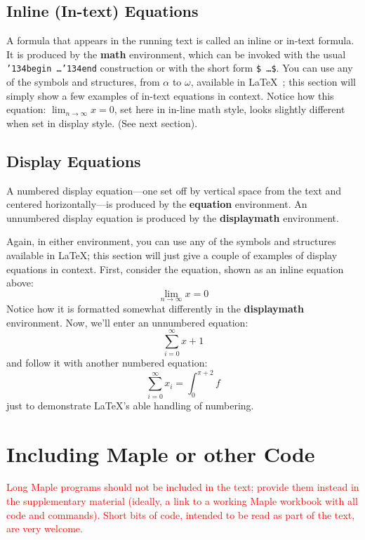 \documentclass[anonymous,review,acmsmall,screen]{MapleTrans}
\begin{document}
\subsection{Inline (In-text) Equations}
A formula that appears in the running text is called an inline or
in-text formula.  It is produced by the \textbf{math} environment,
which can be invoked with the usual
\texttt{{\char'134}begin\,\ldots{\char'134}end} construction or with
the short form \texttt{\$\,\ldots\$}. You can use any of the symbols
and structures, from $\alpha$ to $\omega$, available in
\LaTeX~\cite{Lamport:LaTeX}; this section will simply show a few
examples of in-text equations in context. Notice how this equation:
\begin{math}
  \lim_{n\rightarrow \infty}x=0
\end{math},
set here in in-line math style, looks slightly different when
set in display style.  (See next section).

\subsection{Display Equations}
A numbered display equation---one set off by vertical space from the
text and centered horizontally---is produced by the \textbf{equation}
environment. An unnumbered display equation is produced by the
\textbf{displaymath} environment.

Again, in either environment, you can use any of the symbols and
structures available in \LaTeX\@; this section will just give a couple
of examples of display equations in context.  First, consider the
equation, shown as an inline equation above:
\begin{equation}
  \lim_{n\rightarrow \infty}x=0
\end{equation}
Notice how it is formatted somewhat differently in
the \textbf{displaymath}
environment.  Now, we'll enter an unnumbered equation:
\begin{displaymath}
  \sum_{i=0}^{\infty} x + 1
\end{displaymath}
and follow it with another numbered equation:
\begin{equation}
  \sum_{i=0}^{\infty}x_i=\int_{0}^{\pi+2} f
\end{equation}
just to demonstrate \LaTeX's able handling of numbering.
\section{Including Maple or other Code}
\textcolor{red}{
Long Maple programs should not be included in the text; provide them instead in the supplementary material (ideally, a link to a working Maple workbook with all code and commands).  Short bits of code, intended to be read as part of the text, are very welcome.
}
\end{document}
